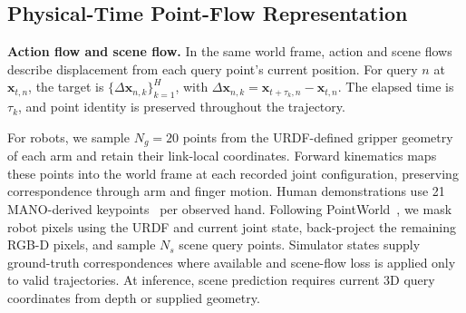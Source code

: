 \subsection{Physical-Time Point-Flow Representation}
\label{sec:method:flow_representation}
\vspace{-0.2cm}

\noindent\textbf{Action flow and scene flow.}
In the same world frame, action and scene flows describe displacement
from each query point's current position.
For query $n$ at $\mathbf x_{t,n}$, the target is
$\{\Delta\mathbf x_{n,k}\}_{k=1}^{H}$, with
$\Delta\mathbf x_{n,k}=\mathbf x_{t+\tau_k,n}-\mathbf x_{t,n}$.
The elapsed time is $\tau_k$, and point identity is preserved throughout
the trajectory.

For robots, we sample $N_g=20$ points from the URDF-defined gripper
geometry of each arm and retain their link-local coordinates.
Forward kinematics maps these points into the world frame at each
recorded joint configuration, preserving correspondence through arm and
finger motion.
Human demonstrations use 21 MANO-derived keypoints~\citep{romero2017mano}
per observed hand. Following PointWorld~\citep{huang2026pointworld},
we mask robot pixels using the URDF and current joint state, back-project
the remaining RGB-D pixels, and sample $N_s$ scene query points. Simulator states supply ground-truth correspondences
where available and scene-flow loss is applied only to valid trajectories.
At inference, scene prediction requires current 3D query coordinates
from depth or supplied geometry.

